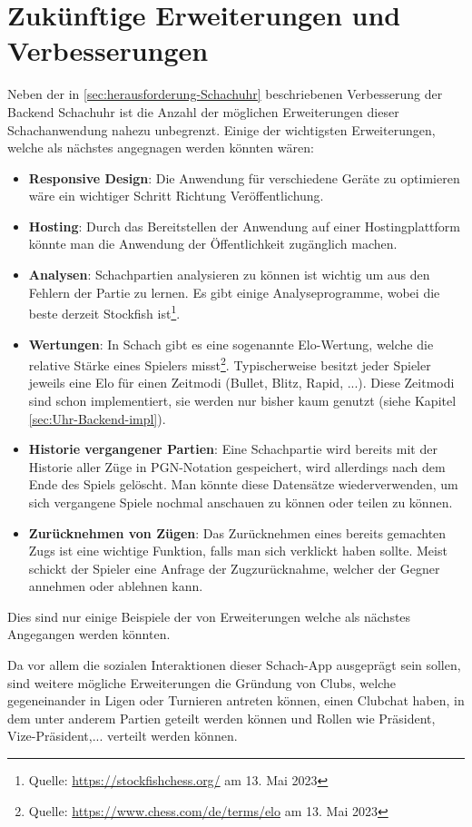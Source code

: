 \section{Zukünftige Erweiterungen und Verbesserungen}
\label{sec:Erweiterungen}
Neben der in \ref{sec:herausforderung-Schachuhr} beschriebenen Verbesserung der Backend Schachuhr ist die Anzahl der möglichen Erweiterungen dieser Schachanwendung nahezu unbegrenzt. Einige der wichtigsten Erweiterungen, welche als nächstes angegnagen werden könnten wären:
\begin{itemize}
\item \textbf{Responsive Design}: Die Anwendung für verschiedene Geräte zu optimieren wäre ein wichtiger Schritt Richtung Veröffentlichung.
\item \textbf{Hosting}: Durch das Bereitstellen der Anwendung auf einer Hostingplattform könnte man die Anwendung der Öffentlichkeit zugänglich machen.
\item \textbf{Analysen}: Schachpartien analysieren zu können ist wichtig um aus den Fehlern der Partie zu lernen. Es gibt einige Analyseprogramme, wobei die beste derzeit Stockfish ist\footnote{Quelle: \url{https://stockfishchess.org/} am 13. Mai 2023}.
\item \textbf{Wertungen}: In Schach gibt es eine sogenannte Elo-Wertung, welche die relative Stärke eines Spielers misst\footnote{Quelle: \url{https://www.chess.com/de/terms/elo} am 13. Mai 2023}. Typischerweise besitzt jeder Spieler jeweils eine Elo für einen Zeitmodi (Bullet, Blitz, Rapid, ...). Diese Zeitmodi sind schon implementiert, sie werden nur bisher kaum genutzt (siehe Kapitel \ref{sec:Uhr-Backend-impl}).
\item \textbf{Historie vergangener Partien}: Eine Schachpartie wird bereits mit der Historie aller Züge in PGN-Notation gespeichert, wird allerdings nach dem Ende des Spiels gelöscht. Man könnte diese Datensätze wiederverwenden, um sich vergangene Spiele nochmal anschauen zu können oder teilen zu können.
\item \textbf{Zurücknehmen von Zügen}: Das Zurücknehmen eines bereits gemachten Zugs ist eine wichtige Funktion, falls man sich verklickt haben sollte. Meist schickt der Spieler eine Anfrage der Zugzurücknahme, welcher der Gegner annehmen oder ablehnen kann.
\end{itemize}

Dies sind nur einige Beispiele der von Erweiterungen welche als nächstes Angegangen werden könnten.

Da vor allem die sozialen Interaktionen dieser Schach-App ausgeprägt sein sollen, sind weitere mögliche Erweiterungen die Gründung von Clubs, welche gegeneinander in Ligen oder Turnieren antreten können, einen Clubchat haben, in dem unter anderem Partien geteilt werden können und Rollen wie Präsident, Vize-Präsident,... verteilt werden können.
 

